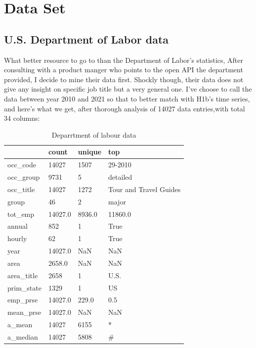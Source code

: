 \section{Data Set}
\subsection{U.S. Department of Labor data}
What better resource to go to than the Department of Labor's statistics, After consulting with a product manger who points to the open API the department provided, I decide to mine their data first.  Shockly though, their data does not give any insight on specific job title but a very general one. I've choose to call the data between year 2010 and 2021 so that to better match with H1b's time series, and here's what we get, after thorough analysis  of 14027 data entries,with total 34 columns:\\
\begin{table}[h!]
	\caption{Deparrtment of  labour data }
	\resizebox{\columnwidth}{!}
	{%
		
		\begin{tabular}{llll}
			\hline
			{} &    count &  unique &                     top \\
			\hline
			occ\_code   &    14027 &    1507 &                 29-2010 \\
			occ\_group  &     9731 &       5 &                detailed \\
			occ\_title  &    14027 &    1272 &  Tour and Travel Guides \\
			group      &       46 &       2 &                   major \\
			tot\_emp    &  14027.0 &  8936.0 &                 11860.0 \\
			annual     &      852 &       1 &                    True \\
			hourly     &       62 &       1 &                    True \\
			year       &  14027.0 &     NaN &                     NaN \\
			area       &   2658.0 &     NaN &                     NaN \\
			area\_title &     2658 &       1 &                    U.S. \\
			prim\_state &     1329 &       1 &                      US \\
			emp\_prse   &  14027.0 &   229.0 &                     0.5 \\
			mean\_prse  &  14027.0 &     NaN &                     NaN \\
			a\_mean     &    14027 &    6155 &                       * \\
			a\_median   &    14027 &    5808 &                       \# \\
			\hline
		\end{tabular}
		
	}
\end{table}

